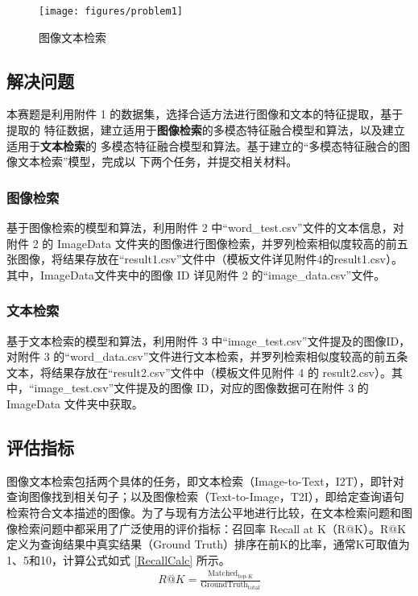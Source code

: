 \documentclass[a4paper]{zreport}
\begin{document}
\begin{figure}[h]
\centering
\texttt{[image: figures/problem1]}
\caption{图像文本检索}
\label{fig:problem1}
\end{figure}

\subsection{解决问题}

本赛题是利用附件 1 的数据集，选择合适方法进行图像和文本的特征提取，基于提取的
特征数据，建立适用于\textbf{图像检索}的多模态特征融合模型和算法，以及建立适用于\textbf{文本检索}的
多模态特征融合模型和算法。基于建立的“多模态特征融合的图像文本检索”模型，完成以
下两个任务，并提交相关材料。

\subsubsection[图像检索]{\textbf{图像检索}}

基于图像检索的模型和算法，利用附件 2 中“word\_test.csv”文件的文本信息，对附件 2 的 ImageData 文件夹的图像进行图像检索，并罗列检索相似度较高的前五张图像，将结果存放在“result1.csv”文件中（模板文件详见附件4的result1.csv）。其中，ImageData文件夹中的图像 ID 详见附件 2 的“image\_data.csv”文件。

\subsubsection[文本检索]{\textbf{文本检索}}

基于文本检索的模型和算法，利用附件 3 中“image\_test.csv”文件提及的图像ID，对附件 3 的“word\_data.csv”文件进行文本检索，并罗列检索相似度较高的前五条文本，将结果存放在“result2.csv”文件中（模板文件见附件 4 的 result2.csv）。其中，“image\_test.csv”文件提及的图像 ID，对应的图像数据可在附件 3 的 ImageData 文件夹中获取。

\subsection{评估指标}

图像文本检索包括两个具体的任务，即文本检索（Image-to-Text，I2T），即针对查询图像找到相关句子；以及图像检索（Text-to-Image，T2I），即给定查询语句检索符合文本描述的图像。为了与现有方法公平地进行比较，在文本检索问题和图像检索问题中都采用了广泛使用的评价指标：召回率 Recall at K（R@K）。R@K定义为查询结果中真实结果（Ground Truth）排序在前K的比率，通常K可取值为1、5和10，计算公式如式 \eqref{RecallCalc} 所示。
\begin{gather}
R@K=\frac{\mathrm{Matched}_{\text{top-}K}}{\mathrm{GroundTruth}_{\text{total}}}\label{RecallCalc}
\end{gather}
\end{document}
